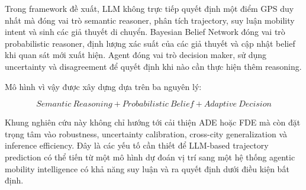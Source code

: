 \documentclass[11pt,a4paper]{article}
\begin{document}
	Trong framework đề xuất, LLM không trực tiếp quyết định một điểm GPS
	duy nhất mà đóng vai trò semantic reasoner, phân tích trajectory, suy
	luận mobility intent và sinh các giả thuyết di chuyển. Bayesian Belief
	Network đóng vai trò probabilistic reasoner, định lượng xác suất của các
	giả thuyết và cập nhật belief khi quan sát mới xuất hiện. Agent đóng vai
	trò decision maker, sử dụng uncertainty và disagreement để quyết định
	khi nào cần thực hiện thêm reasoning.
	
	Mô hình vì vậy được xây dựng dựa trên ba nguyên lý:
	
	\begin{equation}
		\boxed{
			Semantic\ Reasoning
			+
			Probabilistic\ Belief
			+
			Adaptive\ Decision
		}
	\end{equation}
	
	Khung nghiên cứu này không chỉ hướng tới cải thiện ADE hoặc FDE mà còn
	đặt trọng tâm vào robustness, uncertainty calibration, cross-city
	generalization và inference efficiency. Đây là các yếu tố cần thiết để
	LLM-based trajectory prediction có thể tiến từ một mô hình dự đoán vị
	trí sang một hệ thống agentic mobility intelligence có khả năng suy luận
	và ra quyết định dưới điều kiện bất định.
	
\end{document}
